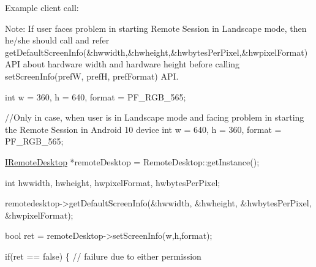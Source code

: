 \-Example client call\-:


\begin{DoxyPre}\end{DoxyPre}



\begin{DoxyPre}  Note: If user faces problem in starting Remote Session in Landscape mode, then he/she should call 
  and refer getDefaultScreenInfo(&hwwidth,&hwheight,&hwbytesPerPixel,&hwpixelFormat) API about
  hardware width and hardware height before calling setScreenInfo(prefW, prefH, prefFormat) API.\end{DoxyPre}



\begin{DoxyPre}  int w = 360, h = 640, format = PF\_RGB\_565;\end{DoxyPre}



\begin{DoxyPre}  //Only in case, when user is in Landscape mode and facing problem in starting the Remote Session in Android 10 device
  int w = 640, h = 360, format = PF\_RGB\_565;\end{DoxyPre}



\begin{DoxyPre}  \hyperlink{classknoxremotedesktop_1_1IRemoteDesktop}{IRemoteDesktop} *remoteDesktop = RemoteDesktop::getInstance();\end{DoxyPre}



\begin{DoxyPre}  int 	 hwwidth, hwheight, hwpixelFormat, hwbytesPerPixel;\end{DoxyPre}



\begin{DoxyPre}  remotedesktop->getDefaultScreenInfo(&hwwidth, &hwheight, &hwbytesPerPixel, &hwpixelFormat);\end{DoxyPre}



\begin{DoxyPre}  bool ret = remoteDesktop->setScreenInfo(w,h,format);\end{DoxyPre}



\begin{DoxyPre}  if(ret == false)  \{ // failure due to either permission\end{DoxyPre}



